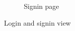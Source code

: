\documentclass{report}
\begin{document}
\begin{figure}[H]
\begin{subfigure}{.5\textwidth}
  \caption{Signin page}
  \label{fig:sub2}
\end{subfigure}
\caption{Login and signin view}
\label{fig:test}
\end{figure}
\end{document}
